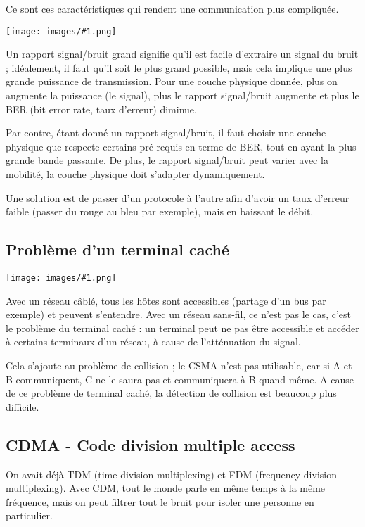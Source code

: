 \documentclass[10pt,a4paper]{report}
\newcommand{\dessin}[1]{\begin{center}\texttt{[image: images/\#1.png]}\end{center}}
\begin{document}
	Ce sont ces caractéristiques qui rendent une communication plus compliquée.
	
	\dessin{29}
	
	Un rapport signal/bruit grand signifie qu'il est facile d'extraire un signal du bruit ; idéalement, il faut qu'il soit le plus grand possible, mais cela implique une plus grande puissance de transmission. Pour une couche physique donnée, plus on augmente la puissance (le signal), plus le rapport signal/bruit augmente et plus le BER (bit error rate, taux d'erreur) diminue.
	
	Par contre, étant donné un rapport signal/bruit, il faut choisir une couche physique que respecte certains pré-requis en terme de BER, tout en ayant la plus grande bande passante. De plus, le rapport signal/bruit peut varier avec la mobilité, la couche physique doit s'adapter dynamiquement.
	
	Une solution est de passer d'un protocole à l'autre afin d'avoir un taux d'erreur faible (passer du rouge au bleu par exemple), mais en baissant le débit.
	
		\subsection{Problème d'un terminal caché}
		
		\dessin{30}
	
		Avec un réseau câblé, tous les hôtes sont accessibles (partage d'un bus par exemple) et peuvent s'entendre. Avec un réseau sans-fil, ce n'est pas le cas, c'est le problème du terminal caché : un terminal peut ne pas être accessible et accéder à certains terminaux d'un réseau, à cause de l'atténuation du signal.
	
		Cela s'ajoute au problème de collision ; le CSMA n'est pas utilisable, car si A et B communiquent, C ne le saura pas et communiquera à B quand même. A cause de ce problème de terminal caché, la détection de collision est beaucoup plus difficile.
		
		
		\subsection{CDMA - Code division multiple access}
		
		On avait déjà TDM (time division multiplexing) et FDM (frequency division multiplexing). Avec CDM, tout le monde parle en même temps à la même fréquence, mais on peut filtrer tout le bruit pour isoler une personne en particulier.
		
\end{document}
